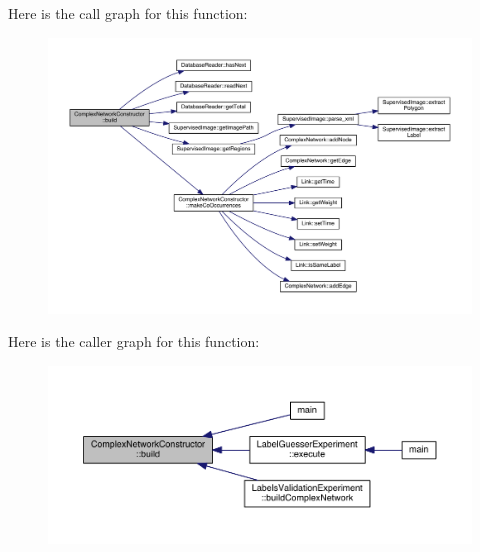 Here is the call graph for this function\+:\nopagebreak
\begin{figure}[H]
\begin{center}
\leavevmode
\includegraphics[width=350pt]{class_complex_network_constructor_a19d313488e2c19172e362b521f53e329_cgraph}
\end{center}
\end{figure}




Here is the caller graph for this function\+:
\nopagebreak
\begin{figure}[H]
\begin{center}
\leavevmode
\includegraphics[width=350pt]{class_complex_network_constructor_a19d313488e2c19172e362b521f53e329_icgraph}
\end{center}
\end{figure}


